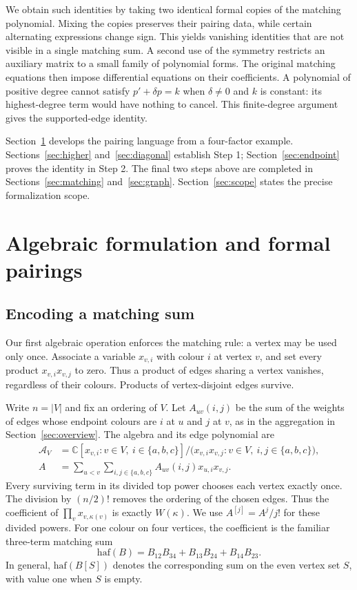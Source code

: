 \documentclass[11pt]{article}
\theoremstyle{definition}
\theoremstyle{plain}
\numberwithin{equation}{section}
\begin{document}
We obtain such identities by taking two identical formal copies of the
matching polynomial. Mixing the copies preserves their pairing data, while
certain alternating expressions change sign. This yields vanishing
identities that are not visible in a single matching sum. A second use of
the symmetry restricts an auxiliary matrix to a small family of polynomial
forms. The original matching equations then impose differential equations
on their coefficients. A polynomial of positive degree cannot satisfy
\(p'+\delta p=k\) when \(\delta\ne0\) and \(k\) is constant: its
highest-degree term would have nothing to cancel. This finite-degree
argument gives the supported-edge identity.

Section~\ref{sec:model} develops the pairing language from a four-factor
example. Sections~\ref{sec:higher} and~\ref{sec:diagonal} establish Step 1;
Section~\ref{sec:endpoint} proves the identity in Step 2. The final two
steps above are completed in Sections~\ref{sec:matching} and~\ref{sec:graph}.
Section~\ref{sec:scope} states the precise formalization scope.

\section{Algebraic formulation and formal pairings}\label{sec:model}

\subsection{Encoding a matching sum}

Our first algebraic operation enforces the matching rule: a vertex may be
used only once. Associate a variable \(x_{v,i}\) with colour \(i\) at
vertex \(v\), and set every product \(x_{v,i}x_{v,j}\) to zero. Thus a
product of edges sharing a vertex vanishes, regardless of their colours.
Products of vertex-disjoint edges survive.

Write \(n=|V|\) and fix an ordering of \(V\).
Let \(A_{uv}(i,j)\) be the sum of the weights of edges whose endpoint colours
are \(i\) at \(u\) and \(j\) at \(v\), as in the aggregation in
Section~\ref{sec:overview}. The algebra and its edge polynomial are
\[
 \begin{aligned}
 \mathcal A_V&=\mathbb C[x_{v,i}:v\in V,\ i\in\{a,b,c\}]
       \big/\bigl(x_{v,i}x_{v,j}:v\in V,\ i,j\in\{a,b,c\}\bigr),\\
 A&=\sum_{u<v}\sum_{i,j\in\{a,b,c\}}A_{uv}(i,j)x_{u,i}x_{v,j}.
 \end{aligned}
\]
Every surviving term in its divided top power chooses each vertex exactly once.
The division by \((n/2)!\) removes the ordering of the chosen edges. Thus the
coefficient of \(\prod_v x_{v,\kappa(v)}\) is exactly \(W(\kappa)\).
We use \(A^{[j]}=A^j/j!\) for these divided powers. For one colour on four
vertices, the coefficient is the familiar three-term matching sum
\[
 \mathrm{haf}(B)=B_{12}B_{34}+B_{13}B_{24}+B_{14}B_{23}.
\]
In general, \(\mathrm{haf}(B[S])\) denotes the corresponding sum on the
even vertex set \(S\), with value one when \(S\) is empty.
\end{document}
